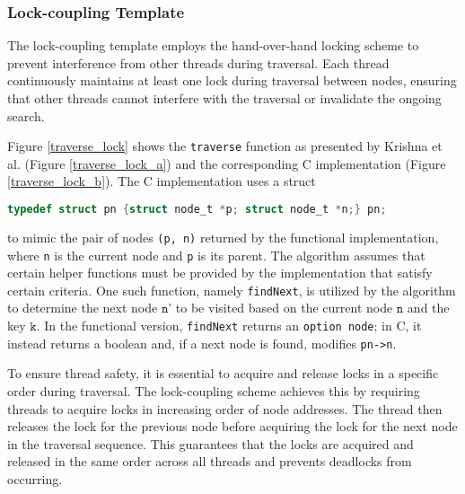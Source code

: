 \documentclass[a4paper,UKenglish,cleveref, autoref, thm-restate]{lipics-v2021}
\begin{document}

\subsubsection{Lock-coupling Template}
\label{lock-coupling-algo}
The lock-coupling template employs the hand-over-hand locking scheme to prevent interference from other threads during traversal. Each thread continuously maintains at least one lock during traversal between nodes, ensuring that other threads cannot interfere with the traversal or invalidate the ongoing search.

Figure \ref{traverse_lock} shows the \lstinline{traverse} function as presented by Krishna et al. (Figure \ref{traverse_lock_a}) and the corresponding C implementation (Figure \ref{traverse_lock_b}). The C implementation uses a struct
\begin{lstlisting}[language = C, backgroundcolor=\color{white}, basicstyle=\ttfamily\footnotesize]
typedef struct pn {struct node_t *p; struct node_t *n;} pn;
\end{lstlisting}
to mimic the pair of nodes \lstinline{(p, n)} returned by the functional implementation, where \lstinline{n} is the current node and \lstinline{p} is its parent. The algorithm assumes that certain helper functions must be provided by the implementation that satisfy certain criteria. One such function, namely \lstinline{findNext}, is utilized by the algorithm to determine the next node $\texttt{n'}$ to be visited based on the current node $\texttt{n}$ and the key $\texttt{k}$. In the functional version, \lstinline{findNext} returns an \lstinline{option node}; in C, it instead returns a boolean and, if a next node is found, modifies \lstinline{pn->n}.

To ensure thread safety, it is essential to acquire and release locks in a specific order during traversal. The lock-coupling scheme achieves this by requiring threads to acquire locks in increasing order of node addresses. The thread then releases the lock for the previous node before acquiring the lock for the next node in the traversal sequence. This guarantees that the locks are acquired and released in the same order across all threads and prevents deadlocks from occurring.
\end{document}
